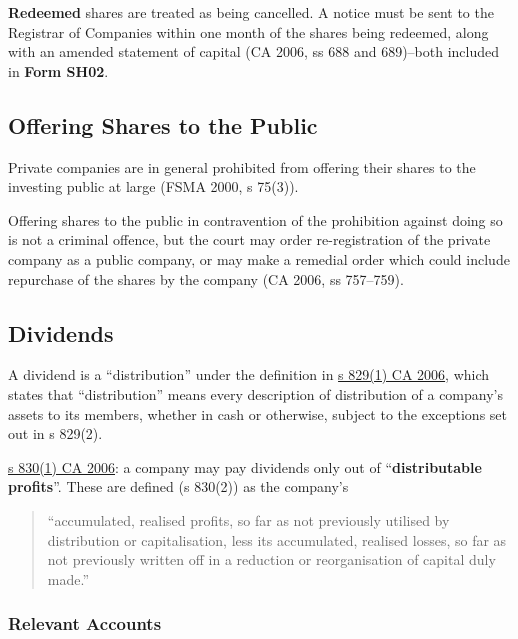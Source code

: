 \documentclass[
]{article}
\begin{document}
\textbf{Redeemed} shares are treated as being cancelled. A notice must
be sent to the Registrar of Companies within one month of the shares
being redeemed, along with an amended statement of capital (CA 2006, ss
688 and 689)--both included in \textbf{Form SH02}.

\hypertarget{offering-shares-to-the-public}{%
\subsection{Offering Shares to the
Public}\label{offering-shares-to-the-public}}

Private companies are in general prohibited from offering their shares
to the investing public at large (FSMA 2000, s 75(3)).

Offering shares to the public in contravention of the prohibition
against doing so is not a criminal offence, but the court may order
re-registration of the private company as a public company, or may make
a remedial order which could include repurchase of the shares by the
company (CA 2006, ss 757--759).

\hypertarget{dividends}{%
\subsection{Dividends}\label{dividends}}

A dividend is a ``distribution'' under the definition in
\href{https://www.legislation.gov.uk/ukpga/2006/46/section/829}{s 829(1)
CA 2006}, which states that ``distribution'' means every description of
distribution of a company's assets to its members, whether in cash or
otherwise, subject to the exceptions set out in s 829(2).

\href{https://www.legislation.gov.uk/ukpga/2006/46/section/830}{s 830(1)
CA 2006}: a company may pay dividends only out of
``\textbf{distributable profits}''. These are defined (s 830(2)) as the
company's

\begin{quote}
``accumulated, realised profits, so far as not previously utilised by
distribution or capitalisation, less its accumulated, realised losses,
so far as not previously written off in a reduction or reorganisation of
capital duly made.''
\end{quote}

\hypertarget{relevant-accounts}{%
\subsubsection{Relevant Accounts}\label{relevant-accounts}}
\end{document}
